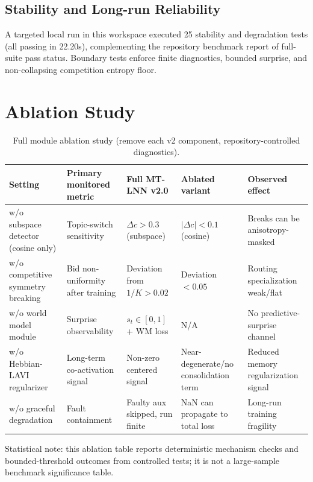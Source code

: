 \documentclass[10pt,twocolumn]{article}
\begin{document}
\subsection{Stability and Long-run Reliability}
A targeted local run in this workspace executed 25 stability and degradation tests (all passing in 22.20s), complementing the repository benchmark report of full-suite pass status. Boundary tests enforce finite diagnostics, bounded surprise, and non-collapsing competition entropy floor.

\section{Ablation Study}
\begin{table}[t]
\centering
\caption{Full module ablation study (remove each v2 component, repository-controlled diagnostics).}
\scriptsize
\renewcommand{\arraystretch}{1.08}
\begin{tabular}{p{}p{}p{}p{}p{}}
\toprule
Setting & Primary monitored metric & Full MT-LNN v2.0 & Ablated variant & Observed effect \\
\midrule
w/o subspace detector (cosine only) & Topic-switch sensitivity & $\Delta c>0.3$ (subspace) & $|\Delta c|<0.1$ (cosine) & Breaks can be anisotropy-masked \\
w/o competitive symmetry breaking & Bid non-uniformity after training & Deviation from $1/K>0.02$ & Deviation $<0.05$ & Routing specialization weak/flat \\
w/o world model module & Surprise observability & $s_t\in[0,1]$ + WM loss & N/A & No predictive-surprise channel \\
w/o Hebbian-LAVI regularizer & Long-term co-activation signal & Non-zero centered signal & Near-degenerate/no consolidation term & Reduced memory regularization signal \\
w/o graceful degradation & Fault containment & Faulty aux skipped, run finite & NaN can propagate to total loss & Long-run training fragility \\
\bottomrule
\end{tabular}
\end{table}

Statistical note: this ablation table reports deterministic mechanism checks and bounded-threshold outcomes from controlled tests; it is not a large-sample benchmark significance table.
\end{document}
